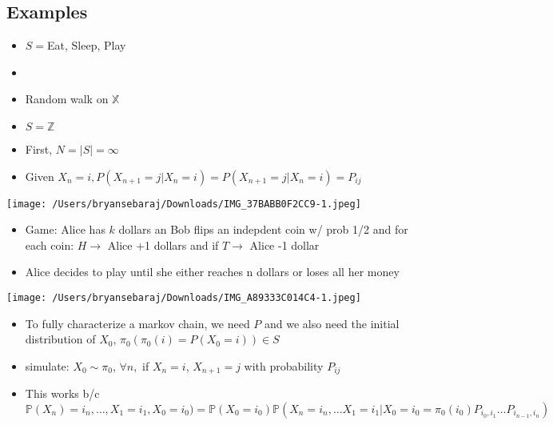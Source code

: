 \documentclass{article}
\begin{document}
\subsection{Examples}
\begin{itemize}
    \item $S=${Eat, Sleep, Play}
    \item 
\end{itemize}


\begin{itemize}
    \item Random walk on $\mathbb{X}$
    \item $S=\mathbb{Z}$
    \item First, $N=|S|=\infty$
    \item Given $X_n = i, P(X_{n+1}=j|X_n=i)=P(X_{n+1}=j|X_n=i)=P_{ij}$
\end{itemize}

\texttt{[image: /Users/bryansebaraj/Downloads/IMG\_37BABB0F2CC9-1.jpeg]}

\begin{itemize}
    \item Game: Alice has $k$ dollars an Bob flips an indepdent coin w/ prob 1/2 and for each coin: $H\rightarrow$ Alice +1 dollars and if $T\rightarrow$ Alice -1 dollar
    \item Alice decides to play until she either reaches n dollars or loses all her money
\end{itemize}

\texttt{[image: /Users/bryansebaraj/Downloads/IMG\_A89333C014C4-1.jpeg]}

\begin{itemize}
    \item To fully characterize a markov chain, we need $P$ and we also need the initial distribution of $X_0$, $\pi_0 (\pi_0(i)=P(X_0=i))\in S$
    \item simulate: $X_0 \sim \pi_0$, $\forall n,$ if $X_n=i$, $X_{n+1}=j$ with probability $P_{ij}$
    \item This works b/c $\mathbb{P}(X_n)=i_n,\ldots, X_1=i_1, X_0=i_0)=\mathbb{P}(X_0=i_0)\mathbb{P}(X_n=i_n,\ldots X_1=i_1|X_0=i_0=\pi_0(i_0)P_{i_0,i_1}\ldots P_{i_{n-1},i_n})$

\end{itemize}
\end{document}
